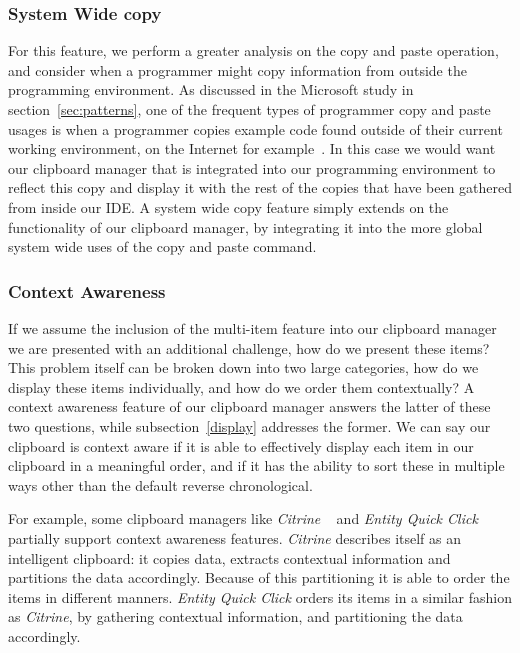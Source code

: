 \documentclass{acm_proc_article-sp}
\begin{document}
\subsubsection{System Wide copy}\label{systemCopy}
For this feature, we perform a greater analysis on the copy and paste operation, and consider when a programmer might copy information from outside the programming environment. As discussed in the Microsoft study in section~\ref{sec:patterns}, one of the frequent types of programmer copy and paste usages is when a programmer copies example code found outside of their current working environment, on the Internet for example~\cite{devWorkHabits}. In this case we would want our clipboard manager that is integrated into our programming environment to reflect this copy and display it with the rest of the copies that have been gathered from inside our IDE. A system wide copy feature simply extends on the functionality of our clipboard manager, by integrating it into the more global system wide uses of the copy and paste command.

\subsubsection{Context Awareness}\label{context}
If we assume the inclusion of the multi-item feature into our clipboard manager we are presented with an additional challenge, how do we present these items? This problem itself can be broken down into two large categories, how do we display these items individually, and how do we order them contextually? A context awareness feature of our clipboard manager answers the latter of these two questions, while subsection~\ref{display} addresses the former. We can say our clipboard is context aware if it is able to effectively display each item in our clipboard in a meaningful order, and if it has the ability to sort these in multiple ways other than the default reverse chronological.
    
For example, some clipboard managers like \textit{Citrine} ~\cite{Citrine} and \textit{Entity Quick Click} ~\cite{Entity} partially support context awareness features. \textit{Citrine} describes itself as an intelligent clipboard: it copies data, extracts contextual information and partitions the data accordingly. Because of this partitioning it is able to order the items in different manners. \textit{Entity Quick Click} orders its items in a similar fashion as \textit{Citrine}, by gathering contextual information, and partitioning the data accordingly.
\end{document}
